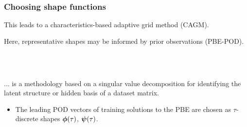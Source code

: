 \documentclass[10pt,xcolor=dvipsnames]{beamer}
\newcommand*{\itemskip}{0.25\baselineskip}
\renewcommand{\cite}{\parencite}
\begin{document}
\begin{frame}[t]

  \frametitle{Choosing shape functions}

  \vspace{-0.75\baselineskip}
  \begin{minipage}[t]{0.45\columnwidth}\vskip0pt
  \begin{center}
  \resizebox{0.85\columnwidth}{!}{}
  \end{center}
  \justifying This leads to a characteristics-based adaptive grid method (CAGM).
  \end{minipage}\hfill
  \begin{minipage}[t]{0.45\columnwidth}\vskip0pt
  \begin{center}
  \resizebox{0.85\columnwidth}{!}{}
  \end{center}
  \justifying Here, representative shapes may be informed by prior observations (PBE-POD).
  \end{minipage}\\
  \vspace{\baselineskip}

   \cite{Holmes2012}\\
  \justifying ... is a methodology based on a singular value decomposition for identifying the latent structure or hidden basis of a dataset matrix.
  \begin{itemize}
  \vspace{\itemskip}
  \item The leading POD vectors of training solutions to the PBE are chosen as $\tau$-discrete shapes ${\boldsymbol \phi}(\tau)$, ${\boldsymbol \psi}(\tau)$.
  \end{itemize}

\end{frame}

\end{document}
